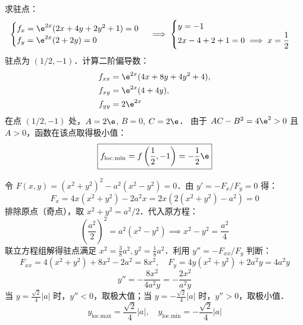 \begin{solution}
    求驻点：
    \begin{equation}
        \begin{cases}
            f_x = \e^{2x}(2x + 4y + 2y^2 + 1) = 0 \\
            f_y = \e^{2x}(2 + 2y) = 0
        \end{cases} \implies
        \begin{cases}
            y = -1 \\
            2x - 4 + 2 + 1 = 0 \implies x = \dfrac{1}{2}
        \end{cases}
    \end{equation}
    驻点为 $(1/2, -1)$．计算二阶偏导数：
    \begin{equation}
        \begin{aligned}
            f_{xx} & = \e^{2x}(4x + 8y + 4y^2 + 4), \\
            f_{xy} & = \e^{2x}(4 + 4y),             \\
            f_{yy} & = 2\e^{2x}
        \end{aligned}
    \end{equation}
    在点 $(1/2, -1)$ 处，$A = 2\e$, $B = 0$, $C = 2\e$．
    由于 $AC - B^2 = 4\e^2 > 0$ 且 $A > 0$，函数在该点取得极小值：
    \begin{equation}
        \boxed{f_{\text{loc.min}} = f\left(\frac{1}{2}, -1\right) = -\frac{1}{2}\e}
    \end{equation}

    令 $F(x, y) = (x^2 + y^2)^2 - a^2(x^2 - y^2) = 0$．由 $y' = -F_x / F_y = 0$ 得：
    \begin{equation}
        F_x = 4x(x^2 + y^2) - 2a^2x = 2x(2(x^2 + y^2) - a^2) = 0
    \end{equation}
    排除原点（奇点），取 $x^2 + y^2 = a^2/2$．代入原方程：
    \begin{equation}
        \left(\frac{a^2}{2}\right)^2 = a^2(x^2 - y^2) \implies x^2 - y^2 = \frac{a^2}{4}
    \end{equation}
    联立方程组解得驻点满足 $x^2 = \frac{3}{8}a^2, y^2 = \frac{1}{8}a^2$．利用 $y'' = -F_{xx} / F_y$ 判断：
    \begin{equation}
        F_{xx} = 4(x^2 + y^2) + 8x^2 - 2a^2 = 8x^2, \quad F_y = 4y(x^2 + y^2) + 2a^2y = 4a^2y
    \end{equation}
    \begin{equation}
        y'' = -\frac{8x^2}{4a^2y} = -\frac{2x^2}{a^2y}
    \end{equation}
    当 $y = \frac{\sqrt{2}}{4}|a|$ 时，$y'' < 0$，取极大值；当 $y = -\frac{\sqrt{2}}{4}|a|$ 时，$y'' > 0$，取极小值．
    \begin{equation}
        \boxed{y_{\text{loc.max}} = \frac{\sqrt{2}}{4}|a|, \quad y_{\text{loc.min}} = -\frac{\sqrt{2}}{4}|a|}
    \end{equation}


\end{solution}
